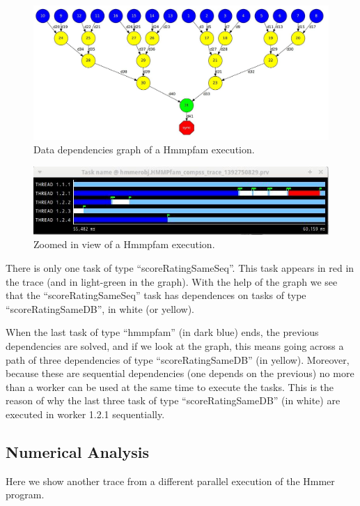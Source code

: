 \begin{figure}[ht!]
  \centering
    \includegraphics[width=1.0\textwidth]{./Sections/5_Analysis/Figures/9.jpeg}
    \caption{Data dependencies graph of a Hmmpfam execution.}
\end{figure}

\begin{figure}[ht!]
  \centering
    \includegraphics[width=1.0\textwidth]{./Sections/5_Analysis/Figures/10.jpeg}
    \caption{Zoomed in view of a Hmmpfam execution.}
\end{figure}

There is only one task of type ``scoreRatingSameSeq''. This task appears in red in the trace 
(and in light-green in the graph). With the help of the graph we see that the ``scoreRatingSameSeq'' 
task has dependences on tasks of type ``scoreRatingSameDB'', in white (or yellow).

When the last task of type ``hmmpfam'' (in dark blue) ends, the previous dependencies are solved, 
and if we look at the graph, this means going across a path of three dependencies of type 
``scoreRatingSameDB'' (in yellow). Moreover, because these are sequential dependencies (one depends 
on the previous) no more than a worker can be used at the same time to execute the tasks. 
This is the reason of why the last three task of type ``scoreRatingSameDB'' (in white) are 
executed in worker 1.2.1 sequentially.

\subsection{Numerical Analysis}
Here we show another trace from a different parallel execution of the Hmmer program.
 
